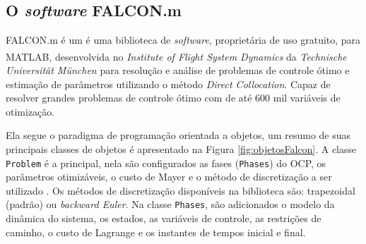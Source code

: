 \subsection{O \textit{software} FALCON.m}

FALCON.m é um é uma biblioteca de \textit{software}, proprietária de uso gratuito, para MATLAB\textsuperscript{\textregistered}, 
desenvolvida no \textit{Institute of Flight System Dynamics} da \textit{Technische Universit{\"a}t M{\"u}nchen} para resolução e 
análise de problemas de controle ótimo e estimação de parâmetros utilizando o método \textit{Direct Collocation}. Capaz de resolver grandes problemas de controle ótimo com de até 600 mil variáveis de otimização.\cite{manual:Falcon, phd:Rieck} 

Ela segue o paradigma de programação orientada a objetos, um resumo de suas principais classes de objetos é apresentado na Figura \ref{fig:objetosFalcon}. 
A classe \lstinline[style=Matlab-editor]{Problem} é a principal, nela são configurados as fases (\lstinline[style=Matlab-editor]{Phases}) do OCP, os parâmetros otimizáveis, o custo de Mayer e
o método de discretização a ser utilizado . Os métodos de discretização disponíveis na biblioteca são: 
trapezoidal (padrão) ou \textit{backward Euler}.  Na classe \lstinline[style=Matlab-editor]{Phases}, são adicionados o modelo da dinâmica do sistema, os estados, as variáveis 
de controle, as restrições de caminho, o custo de Lagrange e os instantes de tempos inicial e final.\cite{phd:Matthias}

